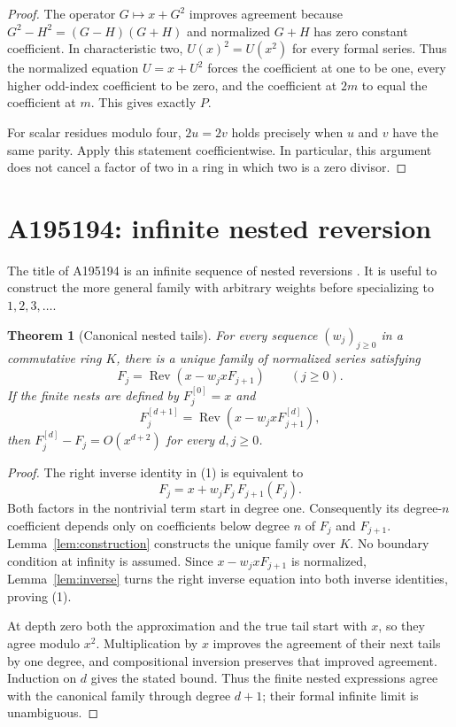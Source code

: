 \documentclass[11pt,a4paper]{article}
\newtheorem{theorem}{Theorem}[section]
\theoremstyle{remark}
\newcommand{\Rev}{\operatorname{Rev}}
\begin{document}
\begin{proof}
The operator $G\mapsto x+G^2$ improves agreement because
$G^2-H^2=(G-H)(G+H)$ and normalized $G+H$ has zero constant coefficient.
In characteristic two, $U(x)^2=U(x^2)$ for every formal series. Thus the
normalized equation $U=x+U^2$ forces the coefficient at one to be one,
every higher odd-index coefficient to be zero, and the coefficient at
$2m$ to equal the coefficient at $m$. This gives exactly $P$.

For scalar residues modulo four, $2u=2v$ holds precisely when $u$ and $v$
have the same parity. Apply this statement coefficientwise. In
particular, this argument does not cancel a factor of two in a ring in
which two is a zero divisor.
\end{proof}

\section{A195194: infinite nested reversion}

The title of A195194 is an infinite sequence of nested reversions
\cite{oeis194}. It is useful to construct the more general family with
arbitrary weights before specializing to $1,2,3,\ldots$.

\begin{theorem}[Canonical nested tails]\label{thm:tails}
For every sequence $(w_j)_{j\ge0}$ in a commutative ring $K$, there is a
unique family of normalized series satisfying
\[
 F_j=\Rev(x-w_jxF_{j+1})\qquad(j\ge0). \tag{1}
\]
If the finite nests are defined by $F_j^{[0]}=x$ and
\[
 F_j^{[d+1]}=\Rev(x-w_jxF_{j+1}^{[d]}),
\]
then $F_j^{[d]}-F_j=O(x^{d+2})$ for every $d,j\ge0$.
\end{theorem}

\begin{proof}
The right inverse identity in (1) is equivalent to
\[
 F_j=x+w_jF_j\,F_{j+1}(F_j). \tag{2}
\]
Both factors in the nontrivial term start in degree one. Consequently its
degree-$n$ coefficient depends only on coefficients below degree $n$ of
$F_j$ and $F_{j+1}$. Lemma~\ref{lem:construction} constructs the unique
family over $K$. No boundary condition at infinity is assumed.
Since $x-w_jxF_{j+1}$ is normalized, Lemma~\ref{lem:inverse} turns the
right inverse equation into both inverse identities, proving (1).

At depth zero both the approximation and the true tail start with $x$,
so they agree modulo $x^2$. Multiplication by $x$ improves the agreement
of their next tails by one degree, and compositional inversion preserves
that improved agreement. Induction on $d$ gives the stated bound. Thus
the finite nested expressions agree with the canonical family through
degree $d+1$; their formal infinite limit is unambiguous.
\end{proof}
\end{document}
